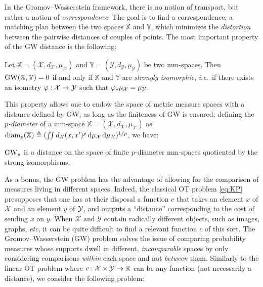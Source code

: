         In the Gromov--Wasserstein framework, there is no notion of transport, but rather a notion of \emph{correspondence}. The goal is to find a correspondence, a matching plan between the two spaces $\mathbb{X}$ and $\mathbb{Y}$, which minimizes the \emph{distortion} between the pairwise distances of couples of points. The most important property of the GW distance is the following:
        \begin{proposition}
            Let $\mathbb{X}=(\mathcal{X},d_{\mathcal{X}},\mu_{\mathcal{X}})$ and $\mathbb{Y}=(\mathcal{Y},d_{\mathcal{Y}},\mu_{\mathcal{Y}})$ be two mm-spaces. Then $\operatorname{GW}(\mathbb{X},\mathbb{Y})=0$ if and only if $\mathbb{X}$ and $\mathbb{Y}$ are \emph{strongly isomorphic}, \textit{i.e.}~if there exists an isometry $\varphi:\mathcal{X}\to\mathcal{Y}$ such that $\varphi_*\mu_{\mathcal{X}}=\mu_{\mathcal{Y}}$.
        \end{proposition}
        This property allows one to endow the space of metric measure spaces with a distance defined by GW, as long as the finiteness of GW is ensured; defining the \emph{$p$-diameter} of a mm-space $\mathbb{X}=(\mathcal{X},d_{\mathcal{X}},\mu_{\mathcal{X}})$ as $\operatorname{diam}_p(\mathbb{X})\triangleq ( \iint d_{\mathcal{X}}(x,x')^p\, \mathrm d\mu_{\mathcal{X}}\, \mathrm d\mu_{\mathcal{X}} )^{1/p}$, we have:
        \begin{proposition}[GW is a distance]
            $\operatorname{GW}_p$ is a distance on the space of finite $p$-diameter mm-spaces quotiented by the strong isomorphisms.
        \end{proposition}
        As a bonus, the GW problem has the advantage of allowing for the comparison of measures living in different spaces. Indeed, the classical OT problem \cref{eq:KP} presupposes that one has at their disposal a function $c$ that takes an element $x$ of $\mathcal{X}$ and an element $y$ of $\mathcal{Y}$, and outputs a ``distance'' corresponding to the cost of sending $x$ on $y$. When $\mathcal{X}$ and $\mathcal{Y}$ contain radically different objects, such as images, graphs, \textit{etc}, it can be quite difficult to find a relevant function $c$ of this sort. The Gromov--Wasserstein (GW) problem solves the issue of comparing probability measures whose supports dwell in different, \emph{incomparable} spaces by only considering comparisons \emph{within} each space and not \emph{between} them. Similarly to the linear OT problem where $c:\mathcal{X}\times\mathcal{Y}\to\mathbb{R}$ can be any function (not necessarily a distance), we consider the following problem:
